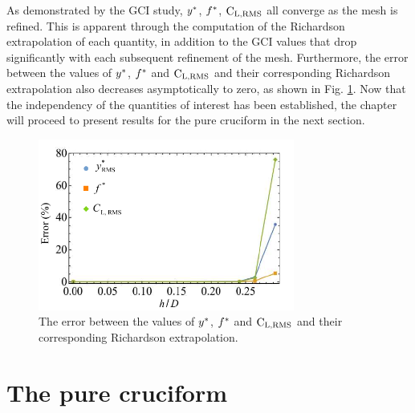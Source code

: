 \documentclass[oneside]{utmthesis}
\begin{document}
As demonstrated by the GCI study, $y^{*}$, $f^{*}$, $\text{C}_{\text{L,RMS}}$ all converge as the mesh is refined. This is apparent through the computation of the Richardson extrapolation of each quantity, in addition to the GCI values that drop significantly with each subsequent refinement of the mesh. Furthermore, the error between the values of $y^{*}$, $f^{*}$ and $\text{C}_{\text{L,RMS}}$ and their corresponding Richardson extrapolation also decreases asymptotically to zero, as shown in Fig. \ref{fig:richardsonError}. Now that the independency of the quantities of interest has been established, the chapter will proceed to present results for the pure cruciform in the next section.

\begin{figure}[!h]
  \centering
  \hspace{1cm} \includegraphics[width=0.75\textwidth]{figs/richardsonError}
  \caption{The error between the values of $y^{*}$, $f^{*}$ and $\text{C}_{\text{L,RMS}}$ and their corresponding Richardson extrapolation.}
  \label{fig:richardsonError}
\end{figure}

\section{The pure cruciform}\label{sec:svivRegime}
\end{document}
